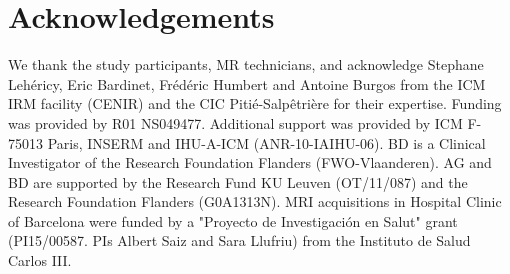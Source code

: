 \documentclass{article}
\begin{document}
\section{Acknowledgements}

We thank the study participants, MR technicians, and acknowledge Stephane Lehéricy, Eric Bardinet, Frédéric Humbert and
Antoine Burgos from the ICM IRM facility (CENIR) and the CIC
Pitié-Salpêtrière for their expertise. Funding was provided by R01 NS049477. Additional support was provided by ICM F-75013 Paris, INSERM and IHU-A-ICM
(ANR-10-IAIHU-06). BD is a Clinical Investigator of the Research Foundation Flanders (FWO-Vlaanderen). AG and BD are supported by the Research Fund KU Leuven (OT/11/087) and the Research Foundation Flanders (G0A1313N). MRI acquisitions in Hospital Clinic of Barcelona were funded by a "Proyecto de Investigación en Salut" grant (PI15/00587. PIs Albert Saiz and Sara Llufriu) from the Instituto de Salud Carlos III.
\end{document}
